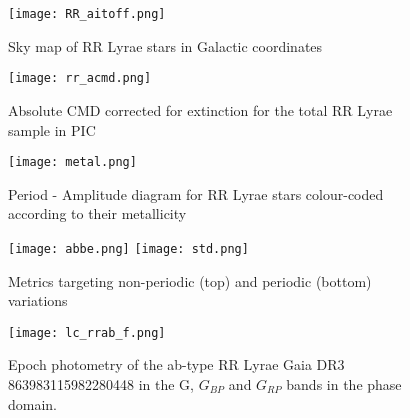 \begin{figure}[H]
\centering
\texttt{[image: RR\_aitoff.png]}
\caption{Sky map of RR Lyrae stars in Galactic coordinates }
\label{fig:All-sky map of RR Lyrae stars}
\end{figure}

\begin{comment}
\begin{figure}[H]
\centering
\texttt{[image: rr\_cmd.png]}
\caption{Absolute CMD corrected for extinction for the RR Lyrae stars in LOPN1}
\label{fig:Absolute CMD corrected for extinction for the RR Lyrae stars in LOPN1}
\end{figure}

\begin{figure}[H]
\centering
\texttt{[image: rr2\_cmd.png]}
\caption{Absolute CMD corrected for extinction for the RR Lyrae stars in LOPS2}
\label{fig:Absolute CMD corrected for extinction for the RR Lyrae stars in LOPS2}
\end{figure}
\end{comment}

\begin{figure}[H]
\centering
\texttt{[image: rr\_acmd.png]}
\caption{Absolute CMD corrected for extinction for the total RR Lyrae sample in PIC}
\label{fig:Absolute CMD corrected for extinction for the total RR Lyrae sample in PIC}
\end{figure}


\begin{figure}[H]
\centering
\texttt{[image: metal.png]}
\caption{Period - Amplitude diagram for RR Lyrae stars colour-coded according to their metallicity}
\label{fig:PA}
\end{figure}

\begin{figure}[H]
\centering
\texttt{[image: abbe.png]}
\texttt{[image: std.png]}
\caption{Metrics targeting non-periodic (top) and periodic (bottom) variations}
\label{fig:metrics}
\end{figure}

\begin{figure}[H]
\centering
\texttt{[image: lc\_rrab\_f.png]}
\caption{Epoch photometry of the ab-type RR Lyrae Gaia DR3 863983115982280448 in the G, $G_{BP}$ and $G_{RP}$ bands in the phase domain. }
\label{fig:lightcurve_rrab_f}
\end{figure}




